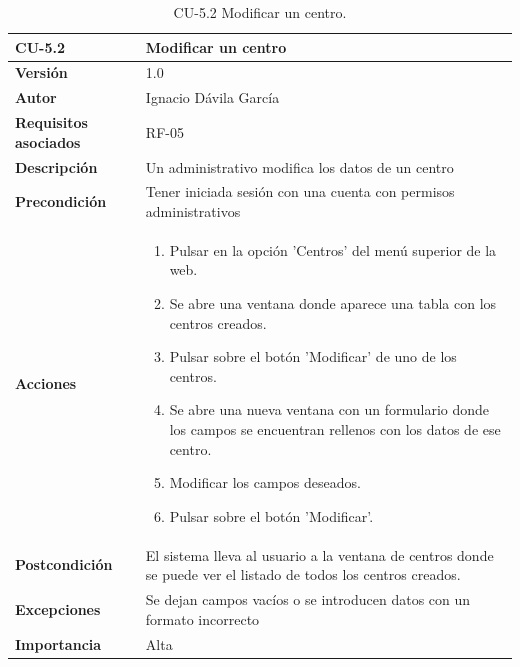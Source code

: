 \begin{table}[p]
	\centering
	\begin{tabularx}{\linewidth}{ p{} p{} }
		\toprule
		\textbf{CU-5.2}    & \textbf{Modificar un centro}\\
		\toprule
		\textbf{Versión}              & 1.0    \\
		\textbf{Autor}                & Ignacio Dávila García \\
		\textbf{Requisitos asociados} & RF-05 \\
		\textbf{Descripción}          & Un administrativo modifica los datos de un centro \\
		\textbf{Precondición}         & Tener iniciada sesión con una cuenta con permisos administrativos \\
		\textbf{Acciones}             &
		\begin{enumerate}
			\def\labelenumi{\arabic{enumi}.}
			\tightlist
			\item Pulsar en la opción 'Centros' del menú superior de la web.
			\item Se abre una ventana donde aparece una tabla con los centros creados.
			\item Pulsar sobre el botón 'Modificar' de uno de los centros.
			\item Se abre una nueva ventana con un formulario donde los campos se encuentran rellenos con los datos de ese centro.
			\item Modificar los campos deseados.
			\item Pulsar sobre el botón 'Modificar'.
		\end{enumerate}\\
		\textbf{Postcondición}        & El sistema lleva al usuario a la ventana de centros donde se puede ver el listado de todos los centros creados. \\
		\textbf{Excepciones}          & Se dejan campos vacíos o se introducen datos con un formato incorrecto \\
		\textbf{Importancia}          & Alta \\
		\bottomrule
	\end{tabularx}
	\caption{CU-5.2 Modificar un centro.}
\end{table}

